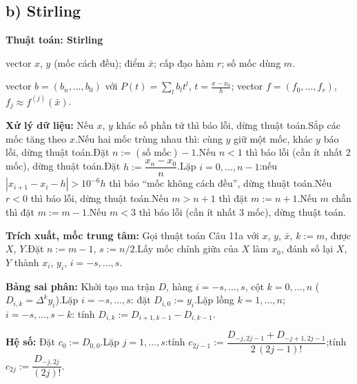 \documentclass[11pt,a4paper]{article}
\newenvironment{thuattoan}[1]
  {\par\medskip\noindent\textbf{Thuật toán: #1}\begin{description}[style=standard,align=left,leftmargin=4.3em,labelwidth=3.9em,labelsep=0.4em,itemsep=1pt,topsep=3pt,font=\normalfont\bfseries]}
  {\end{description}}
\newcommand{\thut}{\newline\hspace*{1.2em}}
\begin{document}
\subsection{b) Stirling}
\begin{thuattoan}{Stirling}
\item[Input:] vector $x$, $y$ (mốc cách đều); điểm $\bar x$; cấp đạo hàm $r$; số mốc dùng $m$.
\item[Output:] vector $b=(b_n,\dots,b_0)$ với $P(t)=\sum_lb_lt^l$, $t=\frac{x-x_0}{h}$; vector $f=(f_0,\dots,f_r)$, $f_j\approx f^{(j)}(\bar x)$.
\item[Bước 0:] \textbf{Xử lý dữ liệu:} Nếu $x$, $y$ khác số phần tử thì báo lỗi, dừng thuật toán.\newline Sắp các mốc tăng theo $x$.\newline Nếu hai mốc trùng nhau thì: cùng $y$ giữ một mốc, khác $y$ báo lỗi, dừng thuật toán.\newline Đặt $n:=(\text{số mốc})-1$.\newline Nếu $n<1$ thì báo lỗi (cần ít nhất 2 mốc), dừng thuật toán.\newline Đặt $h:=\dfrac{x_n-x_0}{n}$.\newline Lặp $i=0,\dots,n-1$:\thut nếu $|x_{i+1}-x_i-h|>10^{-6}h$ thì báo ``mốc không cách đều'', dừng thuật toán.\newline Nếu $r<0$ thì báo lỗi, dừng thuật toán.\newline Nếu $m>n+1$ thì đặt $m:=n+1$.\newline Nếu $m$ chẵn thì đặt $m:=m-1$.\newline Nếu $m<3$ thì báo lỗi (cần ít nhất 3 mốc), dừng thuật toán.
\item[Bước 1:] \textbf{Trích xuất, mốc trung tâm:} Gọi thuật toán Câu 11a với $x$, $y$, $\bar x$, $k:=m$, được $X$, $Y$.\newline Đặt $n:=m-1$, $s:=n/2$.\newline Lấy mốc chính giữa của $X$ làm $x_0$, đánh số lại $X$, $Y$ thành $x_i$, $y_i$, $i=-s,\dots,s$.
\item[Bước 2:] \textbf{Bảng sai phân:} Khởi tạo ma trận $D$, hàng $i=-s,\dots,s$, cột $k=0,\dots,n$ ($D_{i,k}=\Delta^ky_i$).\newline Lặp $i=-s,\dots,s$: đặt $D_{i,0}:=y_i$.\newline Lặp lồng $k=1,\dots,n$; $i=-s,\dots,s-k$: tính $D_{i,k}:=D_{i+1,k-1}-D_{i,k-1}$.
\item[Bước 3:] \textbf{Hệ số:} Đặt $c_0:=D_{0,0}$.\newline Lặp $j=1,\dots,s$:\thut tính $c_{2j-1}:=\dfrac{D_{-j,2j-1}+D_{-j+1,2j-1}}{2\,(2j-1)!}$;\thut tính $c_{2j}:=\dfrac{D_{-j,2j}}{(2j)!}$.

\end{thuattoan}
\end{document}
